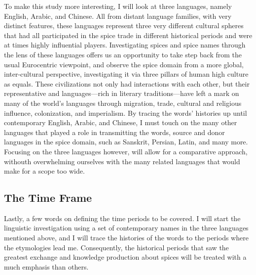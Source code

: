 To make this study more interesting, I will look at three languages, namely English, Arabic, and Chinese. All from distant language families, with very distinct features, these languages represent three very different cultural spheres that had all participated in the spice trade in different historical periods and were at times highly influential players. Investigating spices and spice names through the lens of these languages offers us an opportunity to take step back from the usual Eurocentric viewpoint, and observe the spice domain from a more global, inter-cultural perspective, investigating it via three pillars of human high culture as equals. These civilizations not only had interactions with each other, but their representative and languages---rich in literary traditions---have left a mark on many of the world's languages through migration, trade, cultural and religious influence, colonization, and imperialism. By tracing the words' histories up until contemporary English, Arabic, and Chinese, I must touch on the many other languages that played a role in transmitting the words, source and donor languages in the spice domain, such as Sanskrit, Persian, Latin, and many more. Focusing on the three languages however, will allow for a comparative approach, withouth overwhelming ourselves with the many related languages that would make for a scope too wide.


\subsection{The Time Frame}

Lastly, a few words on defining the time periods to be covered. I will start the linguistic investigation using a set of contemporary names in the three languages mentioned above, and I will trace the histories of the words to the periods where the etymologies lead me. Consequently, the historical periods that saw the greatest exchange and knowledge production about spices will be treated with a much emphasis than others.

